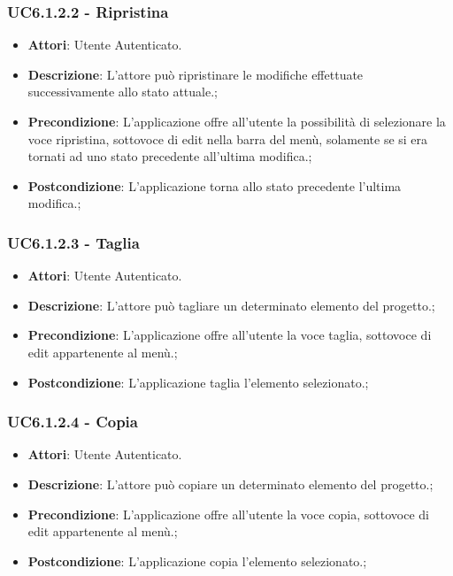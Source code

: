 \subsubsection{UC6.1.2.2 - Ripristina} 
\label{sssec:UC6.1.2.2} 
\begin{itemize} 
\item \textbf{Attori}: Utente Autenticato.
\item \textbf{Descrizione}: L’attore può ripristinare le modifiche effettuate
successivamente allo stato attuale.;
\item \textbf{Precondizione}: L’applicazione offre all’utente la possibilità di selezionare la voce
ripristina, sottovoce di edit nella barra del menù, solamente se si era tornati ad uno
stato precedente all’ultima modifica.;
\item \textbf{Postcondizione}: L’applicazione torna allo stato precedente l’ultima modifica.;
\end{itemize} 
\subsubsection{UC6.1.2.3 - Taglia} 
\label{sssec:UC6.1.2.3} 
\begin{itemize} 
\item \textbf{Attori}: Utente Autenticato.
\item \textbf{Descrizione}: L’attore può tagliare un determinato elemento
del progetto.;
\item \textbf{Precondizione}: L’applicazione offre all’utente la voce taglia, sottovoce di edit appartenente
al menù.;
\item \textbf{Postcondizione}: L’applicazione taglia l’elemento selezionato.;
\end{itemize} 
\subsubsection{UC6.1.2.4 - Copia} 
\label{sssec:UC6.1.2.4} 
\begin{itemize} 
\item \textbf{Attori}: Utente Autenticato.
\item \textbf{Descrizione}: L’attore può copiare un determinato elemento
del progetto.;
\item \textbf{Precondizione}: L’applicazione offre all’utente la voce copia, sottovoce di edit appartenente
al menù.;
\item \textbf{Postcondizione}: L’applicazione copia l’elemento selezionato.;
\end{itemize} 
